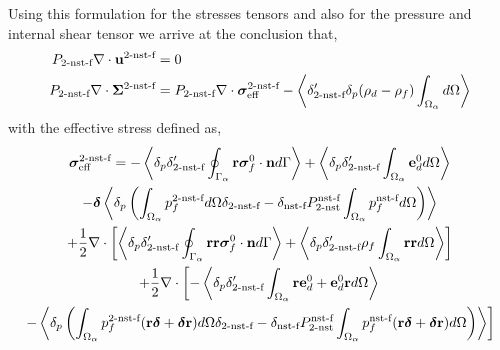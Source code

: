 Using this formulation for the stresses tensors and also for the pressure and internal shear tensor we arrive at the conclusion that, 
\begin{align}
    P_\text{2-nst-f}\mathbf{\nabla}\cdot \textbf{u}^\text{2-nst-f} & =0 \\
    P_\text{2-nst-f}\mathbf{\nabla}\cdot \bm\Sigma^\text{2-nst-f}
    &=
    P_\text{2-nst-f}\mathbf{\nabla}\cdot \bm\sigma^\text{2-nst-f}_\text{eff}
    - \left<\delta_\text{2-nst-f}'\delta_p  (\rho_d - \rho_f) \int_{\Omega_{\alpha}}  d\Omega\right>
\end{align}
with the effective stress defined as, 
\begin{multline}
    \bm\sigma^\text{2-nst-f}_\text{eff}
    =
    - \left<\delta_p \delta_\text{2-nst-f}'\oint_{\Gamma_{\alpha}} \textbf{r}\bm\sigma_f^0 \cdot \textbf{n} d\Gamma\right>
    + \left<\delta_p \delta_\text{2-nst-f}' \int_{\Omega_{\alpha}} \textbf{e}_d^0 d\Omega \right>  \\
    -\bm\delta \left<\delta_p \left(\int_{\Omega_{\alpha}} p^\text{2-nst-f}_f  d\Omega\delta_\text{2-nst-f} - \delta_\text{nst-f}P_\text{2-nst}^\text{nst-f} \int_{\Omega_{\alpha}} p^\text{nst-f}_f d\Omega \right)\right>\\
    + \frac{1}{2}\mathbf{\nabla}\cdot \left[
        \left<\delta_p \delta_\text{2-nst-f}'\oint_{\Gamma_{\alpha}} \textbf{rr}\bm\sigma_f^0 \cdot \textbf{n} d\Gamma\right>
        + \left<\delta_p \delta_\text{2-nst-f}'\rho_f \int_{\Omega_{\alpha}} \textbf{rr} d\Omega\right>
    \right]\\
    + \frac{1}{2}\mathbf{\nabla}\cdot \left[
        - \left<\delta_p \delta_\text{2-nst-f}' \int_{\Omega_{\alpha}} \textbf{r}\textbf{e}_d^0+ \textbf{e}_d^0 \textbf{r} d\Omega \right>  \right. \\ \left. 
        - \left<\delta_p \left(\int_{\Omega_{\alpha}} p^\text{2-nst-f}_f (\textbf{r}\bm\delta + \bm\delta \textbf{r}) d\Omega\delta_\text{2-nst-f} - \delta_\text{nst-f}P_\text{2-nst}^\text{nst-f} \int_{\Omega_{\alpha}} p^\text{nst-f}_f (\textbf{r}\bm\delta + \bm\delta \textbf{r}) d\Omega \right)\right>
    \right]
\end{multline}

